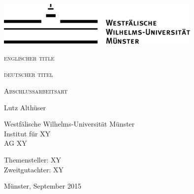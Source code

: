 \begin{titlepage}
\thispagestyle{empty}
 \begin{center}
 \includegraphics[width=10cm]{res/WWU_Logo1_1c}
 \par
 \vspace*{10ex}
 \huge
 \textsc{englischer title}
 \par
 \vspace*{3ex}
 \textsc{deutscher titel}
 \par
 \normalsize
 \vspace*{25ex}
 \large
 \textsc{Abschlussarbeitsart}\\
 \par
 \large
 Lutz Althüser
 \par
 \normalsize
 \vspace*{1ex}
Westfälische Wilhelms-Universität Münster\\
Institut für XY \\
AG XY
\par
\vspace*{15ex}
Themensteller: XY \\ 
Zweitgutachter: XY
\par
\normalsize
\vspace*{2ex}
Münster, September 2015
\end{center}
\clearpage

\end{titlepage}
